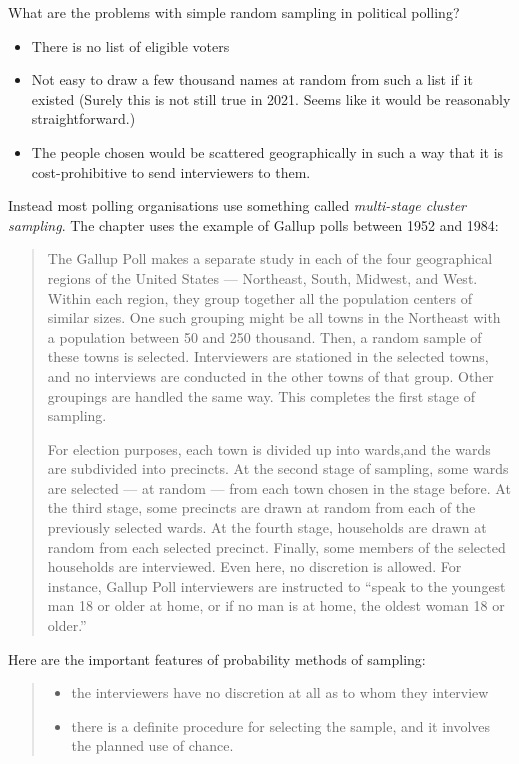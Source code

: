 \documentclass[
]{book}
\providecommand{\tightlist}{%
  \setlength{\itemsep}{0pt}\setlength{\parskip}{0pt}}
\begin{document}
What are the problems with simple random sampling in political polling?

\begin{itemize}
\tightlist
\item
  There is no list of eligible voters
\item
  Not easy to draw a few thousand names at random from such a list if it existed (Surely this is not still true in 2021. Seems like it would be reasonably straightforward.)
\item
  The people chosen would be scattered geographically in such a way that it is cost-prohibitive to send interviewers to them.
\end{itemize}

Instead most polling organisations use something called \emph{multi-stage cluster sampling}. The chapter uses the example of Gallup polls between 1952 and 1984:

\begin{quote}
The Gallup Poll makes a separate study in each of the four geographical regions of the United States --- Northeast, South, Midwest, and West. Within each region, they group together all the population centers of similar sizes. One such grouping might be all towns in the Northeast with a population between 50 and 250 thousand. Then, a random sample of these towns is selected. Interviewers are stationed in the selected towns, and no interviews are conducted in the other towns of that group. Other groupings are handled the same way. This completes the first stage of sampling.

For election purposes, each town is divided up into wards,and the wards are subdivided into precincts. At the second stage of sampling, some wards are selected --- at random --- from each town chosen in the stage before. At the third stage, some precincts are drawn at random from each of the previously selected wards. At the fourth stage, households are drawn at random from each selected precinct. Finally, some members of the selected households are interviewed. Even here, no discretion is allowed. For instance, Gallup Poll interviewers are instructed to ``speak to the youngest man 18 or older at home, or if no man is at home, the oldest woman 18 or older.''
\end{quote}

Here are the important features of probability methods of sampling:

\begin{quote}
\begin{itemize}
\tightlist
\item
  the interviewers have no discretion at all as to whom they interview
\item
  there is a definite procedure for selecting the sample, and it involves the planned use of chance.
\end{itemize}
\end{quote}
\end{document}
